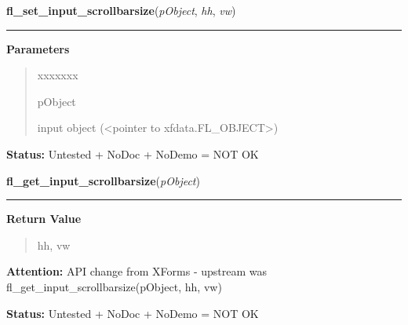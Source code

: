 \hspace{.8\funcindent}\begin{boxedminipage}{\funcwidth}

    \raggedright \textbf{fl\_set\_input\_scrollbarsize}(\textit{pObject}, \textit{hh}, \textit{vw})

    \vspace{-1.5ex}

    \rule{\textwidth}{0.5\fboxrule}
\setlength{\parskip}{2ex}
\setlength{\parskip}{1ex}
      \textbf{Parameters}
      \vspace{-1ex}

      \begin{quote}
        \begin{Ventry}{xxxxxxx}

          \item[pObject]

          input object ({\textless}pointer to 
          xfdata.FL\_OBJECT{\textgreater})

        \end{Ventry}

      \end{quote}

\textbf{Status:} Untested + NoDoc + NoDemo = NOT OK



    \end{boxedminipage}

    \label{xformslib:library:fl_get_input_scrollbarsize}

    \vspace{0.5ex}

\hspace{.8\funcindent}\begin{boxedminipage}{\funcwidth}

    \raggedright \textbf{fl\_get\_input\_scrollbarsize}(\textit{pObject})

    \vspace{-1.5ex}

    \rule{\textwidth}{0.5\fboxrule}
\setlength{\parskip}{2ex}
\setlength{\parskip}{1ex}
      \textbf{Return Value}
    \vspace{-1ex}

      \begin{quote}
      hh, vw

      \end{quote}

\textbf{Attention:} API change from XForms - upstream was 
fl\_get\_input\_scrollbarsize(pObject, hh, vw)



\textbf{Status:} Untested + NoDoc + NoDemo = NOT OK



    \end{boxedminipage}

